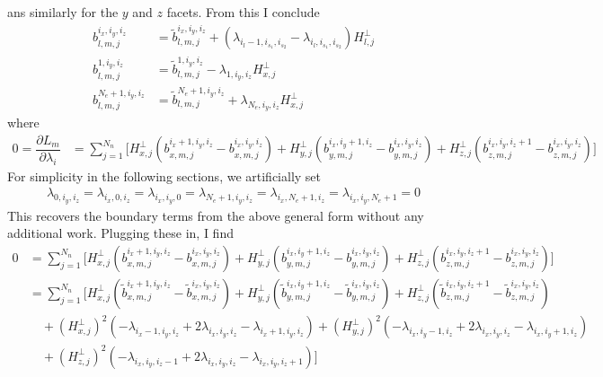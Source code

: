 \documentclass[12pt,a4paper]{article}
\newcommand{\pder}[2][]{\dfrac{\partial #1}{\partial #2}} %
\begin{document}
ans similarly for the $y$ and $z$ facets. From this I conclude
\begin{align*}
b_{l,m,j}^{i_x,i_y,i_z}  &=  \tilde{b}^{i_x,i_y,i_z}_{l,m,j}  + \left( \lambda_{i_l-1,i_{s_1},i_{s_2}} -  \lambda_{i_l,i_{s_1},i_{s_2}} \right) H_{l , j}^\bot  \\
b_{l,m,j}^{1,i_y,i_z}  &=  \tilde{b}^{1,i_y,i_z}_{l,m,j}  - \lambda_{1,i_y,i_z} H_{x , j}^\bot  \\
b_{l,m,j}^{N_e+1,i_y,i_z}  &=  \tilde{b}^{N_e+1,i_y,i_z}_{l,m,j}  + \lambda_{N_e,i_y,i_z} H_{x , j}^\bot 
\end{align*}
where
\begin{align*}
0 = \pder[L_m]{\lambda_i} &= \sum_{j=1}^{N_n} \Big[ H^\bot_{x,j} \left( b_{x,m,j}^{i_x+1,i_y,i_z} - b_{x,m,j}^{i_x,i_y,i_z} \right) + H^\bot_{y,j} \left( b_{y,m,j}^{i_x,i_y+1,i_z} - b_{y,m,j}^{i_x,i_y,i_z} \right) + H^\bot_{z,j} \left( b_{z,m,j}^{i_x,i_y,i_z+1} - b_{z,m,j}^{i_x,i_y,i_z} \right) \Big]
\end{align*}
For simplicity in the following sections, we artificially set 
\begin{align*}
 \lambda_{0,i_y,i_z} =  \lambda_{i_x,0,i_z} =  \lambda_{i_x,i_y,0} =   \lambda_{N_e+1,i_y,i_z} =  \lambda_{i_x,N_e+1,i_z} =  \lambda_{i_x,i_y,N_e+1} = 0
\end{align*}
This recovers the boundary terms from the above general form without any additional work. Plugging these in, I find
\begin{align*}
0 &= \sum_{j=1}^{N_n} \Big[ H^\bot_{x,j} \left( b_{x,m,j}^{i_x+1,i_y,i_z} - b_{x,m,j}^{i_x,i_y,i_z} \right) + H^\bot_{y,j} \left( b_{y,m,j}^{i_x,i_y+1,i_z} - b_{y,m,j}^{i_x,i_y,i_z} \right) + H^\bot_{z,j} \left( b_{z,m,j}^{i_x,i_y,i_z+1} - b_{z,m,j}^{i_x,i_y,i_z} \right) \Big] \\
&=  \sum_{j=1}^{N_n} \Big[ H^\bot_{x,j} \left( \tilde{b}_{x,m,j}^{i_x+1,i_y,i_z} - \tilde{b}_{x,m,j}^{i_x,i_y,i_z} \right) + H^\bot_{y,j} \left( \tilde{b}_{y,m,j}^{i_x,i_y+1,i_z} - \tilde{b}_{y,m,j}^{i_x,i_y,i_z} \right) + H^\bot_{z,j} \left( \tilde{b}_{z,m,j}^{i_x,i_y,i_z+1} - \tilde{b}_{z,m,j}^{i_x,i_y,i_z} \right) \\
& \quad + \left( H^\bot_{x,j} \right)^2 \left(
 -  \lambda_{i_x-1,i_y,i_z} + 2 \lambda_{i_x,i_y,i_z}  -  \lambda_{i_x+1,i_y,i_z}  \right)  + \left( H^\bot_{y,j} \right)^2 \left(
 -  \lambda_{i_x,i_y-1,i_z} + 2 \lambda_{i_x,i_y,i_z}  -  \lambda_{i_x,i_y+1,i_z}  \right) \\
 & \quad + \left( H^\bot_{z,j} \right)^2 \left(
 -  \lambda_{i_x,i_y,i_z-1} + 2 \lambda_{i_x,i_y,i_z}  -  \lambda_{i_x,i_y,i_z+1}  \right) \Big]
\end{align*}
\end{document}
